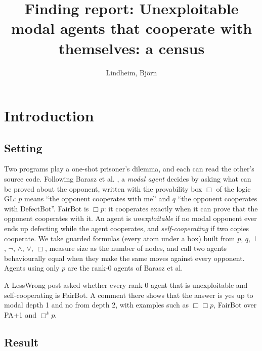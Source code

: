\documentclass{article}
\title{Finding report: Unexploitable modal agents that cooperate with themselves: a census}
\author{Lindheim, Björn}
\date{}
\begin{document}
\maketitle
\section{Introduction}
\label{sec:only-one-fairbot-census}

\subsection*{Setting}

Two programs play a one-shot prisoner's dilemma, and each can read the other's source code.
Following Barasz et al. \cite{barasz2014robust}, a \emph{modal agent} decides by asking what can be proved
about the opponent, written with the provability box $\Box$ of the logic GL: $p$ means ``the
opponent cooperates with me'' and $q$ ``the opponent cooperates with DefectBot''. FairBot is
$\Box p$: it cooperates exactly when it can prove that the opponent cooperates with it. An agent
is \emph{unexploitable} if no modal opponent ever ends up defecting while the agent cooperates, and
\emph{self-cooperating} if two copies cooperate. We take guarded formulas (every atom under a box)
built from $p$, $q$, $\bot$, $\neg$, $\wedge$, $\vee$, $\Box$, measure size as the number of
nodes, and call two agents behaviourally equal when they make the same moves against every
opponent. Agents using only $p$ are the rank-0 agents of Barasz et al.

A LessWrong post \cite{onlyonefairbot2026} asked whether every rank-0 agent that is unexploitable and
self-cooperating is FairBot. A comment there shows that the answer is yes up to modal depth 1 and
no from depth 2, with examples such as $\Box\Box p$, FairBot over PA+1 and $\Box^k p$.

\subsection*{Result}
\end{document}
